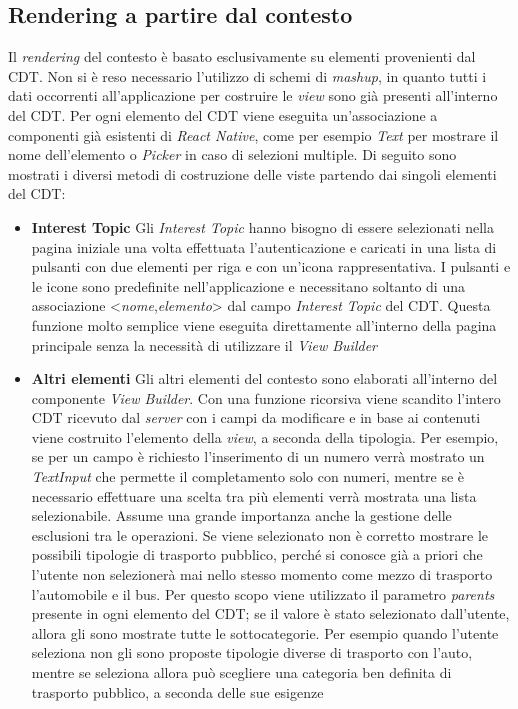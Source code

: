 \subsection{Rendering a partire dal contesto}

Il \emph{rendering} del contesto è basato esclusivamente su elementi provenienti dal CDT. Non si è reso necessario l'utilizzo di schemi di \textit{mashup}, in quanto tutti i dati occorrenti all'applicazione per costruire le \emph{view} sono già presenti all'interno del CDT. Per ogni elemento del CDT viene eseguita un'associazione a componenti già esistenti di \emph{React Native}, come per esempio \emph{Text} per mostrare il nome dell'elemento o \emph{Picker} in caso di selezioni multiple. Di seguito sono mostrati i diversi metodi di costruzione delle viste partendo dai singoli elementi del CDT:

\begin{itemize}
	\item \textbf{Interest Topic}
	Gli \emph{Interest Topic} hanno bisogno di essere selezionati nella pagina iniziale una volta effettuata l'autenticazione e caricati in una lista di pulsanti con due elementi per riga e con un'icona rappresentativa. I pulsanti e le icone sono predefinite nell'applicazione e necessitano soltanto di una associazione <\emph{nome},\emph{elemento}> dal campo \emph{Interest Topic} del CDT. Questa funzione molto semplice viene eseguita direttamente all'interno della pagina principale senza la necessità di utilizzare il \emph{View Builder}
	\item \textbf{Altri elementi}
	Gli altri elementi del contesto sono elaborati all'interno del componente \emph{View Builder}. Con una funzione ricorsiva viene scandito l'intero CDT ricevuto dal \emph{server} con i campi da modificare e in base ai contenuti viene costruito l'elemento della \emph{view}, a seconda della tipologia. Per esempio, se per un campo è richiesto l'inserimento di un numero verrà mostrato un \emph{TextInput} che permette il completamento solo con numeri, mentre se è necessario effettuare una scelta tra più elementi verrà mostrata una lista selezionabile.
	Assume una grande importanza anche la gestione delle esclusioni tra le operazioni. Se viene selezionato  non è corretto mostrare le possibili tipologie di trasporto pubblico, perché si conosce già a priori che l'utente non selezionerà mai nello stesso momento come mezzo di trasporto l'automobile e il bus. Per questo scopo viene utilizzato il parametro \emph{parents} presente in ogni elemento del CDT; se il valore è stato selezionato dall'utente, allora gli sono mostrate tutte le sottocategorie. Per esempio quando l'utente seleziona  non gli sono proposte tipologie diverse di trasporto con l'auto, mentre se seleziona  allora può scegliere una categoria ben definita di trasporto pubblico, a seconda delle sue esigenze
\end{itemize}
	
